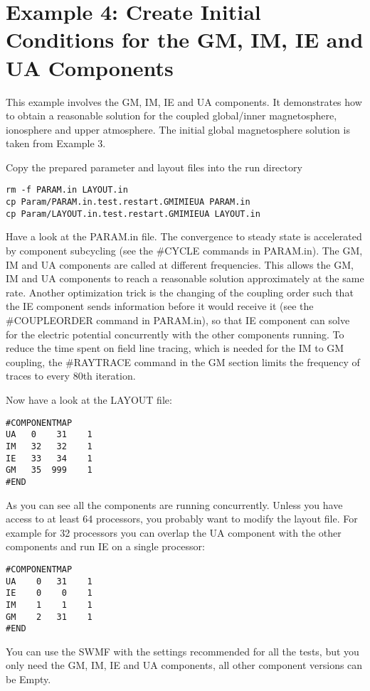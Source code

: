 \section{
Example 4: Create Initial Conditions for the GM, IM, IE and UA Components}

This example involves the GM, IM, IE and UA components. It demonstrates
how to obtain a reasonable solution for the 
coupled global/inner magnetosphere, ionosphere and upper atmosphere.
The initial global magnetosphere solution is taken from Example 3.

Copy the prepared parameter and layout files into the run directory
\begin{verbatim}
rm -f PARAM.in LAYOUT.in
cp Param/PARAM.in.test.restart.GMIMIEUA PARAM.in
cp Param/LAYOUT.in.test.restart.GMIMIEUA LAYOUT.in
\end{verbatim}
Have a look at the PARAM.in file.
The convergence to steady state is accelerated by component subcycling
(see the \#CYCLE commands in PARAM.in).
The GM, IM and UA components are called at different frequencies.
This allows the GM, IM and UA components to reach a reasonable solution
approximately at the same rate. Another optimization trick is the changing of 
the coupling order such that the IE component sends information before
it would receive it (see the \#COUPLEORDER command in PARAM.in),
so that IE component can solve for the electric potential concurrently with the
other components running. To reduce the time spent on field line
tracing, which is needed for the IM to GM coupling, the \#RAYTRACE command
in the GM section limits the frequency of traces to every 80th iteration.

Now have a look at the LAYOUT file:
\begin{verbatim}
#COMPONENTMAP
UA   0    31    1
IM   32   32    1
IE   33   34    1
GM   35  999    1
#END
\end{verbatim}
As you can see all the components are running concurrently.
Unless you have access to at least 64 processors, 
you probably want to modify the layout file.
For example for 32 processors you can overlap the UA component 
with the other components and run IE on a single processor:
\begin{verbatim}
#COMPONENTMAP
UA    0   31    1
IE    0    0    1
IM    1    1    1
GM    2   31    1
#END
\end{verbatim}
You can use the SWMF with the settings recommended for all the tests, 
but you only need the GM, IM, IE and UA components,
all other component versions can be Empty.

